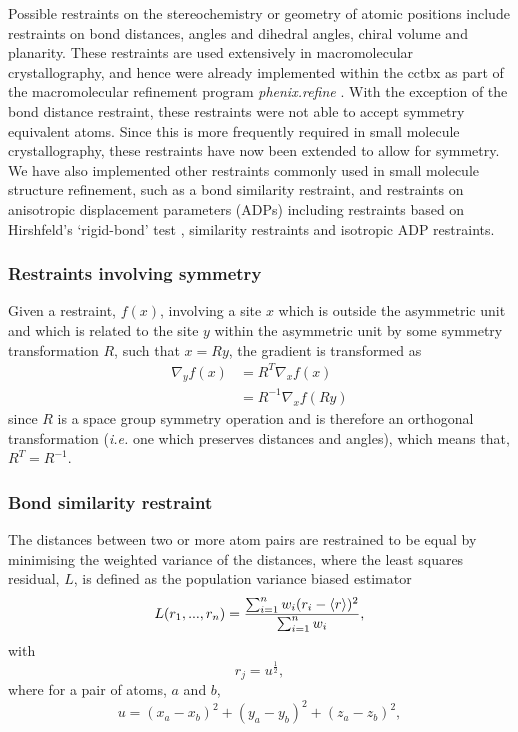 \documentclass[pdf]{iucr}
\begin{document}
Possible restraints on the stereochemistry or geometry of atomic positions include restraints on bond distances, angles and dihedral angles, chiral volume and planarity. These restraints are used extensively in macromolecular crystallography, and hence were already implemented within the cctbx as part of the macromolecular refinement program \emph{phenix.refine} \cite{Afonine:ba5180}. With the exception of the bond distance restraint, these restraints were not able to accept symmetry equivalent atoms. Since this is more frequently required in small molecule crystallography, these restraints have now been extended to allow for symmetry. We have also implemented other restraints commonly used in small molecule structure refinement, such as a bond similarity restraint, and restraints on anisotropic displacement parameters (ADPs) including restraints based on Hirshfeld's `rigid-bond' test \cite{Hirshfeld:a12865}, similarity restraints and isotropic ADP restraints.



\subsubsection{Restraints involving symmetry}

Given a restraint, $f(x)$, involving a site $x$ which is outside the asymmetric unit and which is related to the site $y$ within the asymmetric unit by some symmetry transformation $R$, such that $x=Ry$, the gradient is transformed as
\begin{align}
\nabla_y f\left(x \right)  &= R^T \nabla_x f\left(x\right) \nonumber\\
&= R^{-1} \nabla_x f\left(R y\right)
\label{eq:}
\end{align}
since $R$ is a space group symmetry operation and is therefore an orthogonal transformation (\emph{i.e.} one which preserves distances and angles), which means that, $R^T = R^{-1}$.



\subsubsection{Bond similarity restraint}

The distances between two or more atom pairs are restrained to be equal by minimising the weighted variance of the distances, where the least squares residual, $L$, is defined as the population variance biased estimator
\begin{equation}
\label{eq:bond_similarity}
L(r_1,...,r_n) = \frac{\sum_{i = 1}^n {w_i(r_i - \left\langle r \right\rangle)^2}}
                      {\sum_{i = 1}^n {w_i}},
\end{equation}
with
\begin{equation*}
r_j = u^\frac{1}{2},
\end{equation*}
where for a pair of atoms, $a$ and $b$,
\begin{equation*}
u = (x_a - x_b)^2 + (y_a - y_b)^2 + (z_a - z_b)^2,
\end{equation*}
\end{document}
